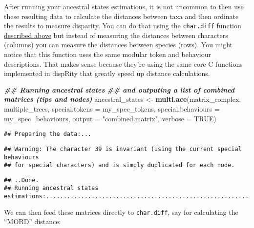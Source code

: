 \documentclass[
]{book}
\newenvironment{Shaded}{\begin{snugshade}}{\end{snugshade}}
\newcommand{\AttributeTok}[1]{\textcolor[rgb]{0.13,0.29,0.53}{#1}}
\newcommand{\ConstantTok}[1]{\textcolor[rgb]{0.56,0.35,0.01}{#1}}
\newcommand{\DocumentationTok}[1]{\textcolor[rgb]{0.56,0.35,0.01}{\textbf{\textit{#1}}}}
\newcommand{\FunctionTok}[1]{\textcolor[rgb]{0.13,0.29,0.53}{\textbf{#1}}}
\newcommand{\NormalTok}[1]{#1}
\newcommand{\OtherTok}[1]{\textcolor[rgb]{0.56,0.35,0.01}{#1}}
\newcommand{\StringTok}[1]{\textcolor[rgb]{0.31,0.60,0.02}{#1}}
\begin{document}
After running your ancestral states estimations, it is not uncommon to then use these resulting data to calculate the distances between taxa and then ordinate the results to measure disparity.
You can do that using the \texttt{char.diff} function \protect\hyperlink{char.diff}{described above} but instead of measuring the distances between characters (columns) you can measure the distances between species (rows).
You might notice that this function uses the same modular token and behaviour descriptions.
That makes sense because they're using the same core C functions implemented in dispRity that greatly speed up distance calculations.

\begin{Shaded}
\begin{Highlighting}[]
\DocumentationTok{\#\# Running ancestral states}
\DocumentationTok{\#\# and outputing a list of combined matrices (tips and nodes)}
\NormalTok{ancestral\_states }\OtherTok{\textless{}{-}} \FunctionTok{multi.ace}\NormalTok{(matrix\_complex, multiple\_trees,}
                              \AttributeTok{special.tokens =}\NormalTok{ my\_spec\_tokens,}
                              \AttributeTok{special.behaviours =}\NormalTok{ my\_spec\_behaviours,}
                              \AttributeTok{output =} \StringTok{"combined.matrix"}\NormalTok{,}
                              \AttributeTok{verbose =} \ConstantTok{TRUE}\NormalTok{)}
\end{Highlighting}
\end{Shaded}

\begin{verbatim}
## Preparing the data:...
\end{verbatim}

\begin{verbatim}
## Warning: The character 39 is invariant (using the current special behaviours
## for special characters) and is simply duplicated for each node.
\end{verbatim}

\begin{verbatim}
## ..Done.
## Running ancestral states estimations:.....................................................................................................................................................................................................................................................Done.
\end{verbatim}

We can then feed these matrices directly to \texttt{char.diff}, say for calculating the ``MORD'' distance:
\end{document}
